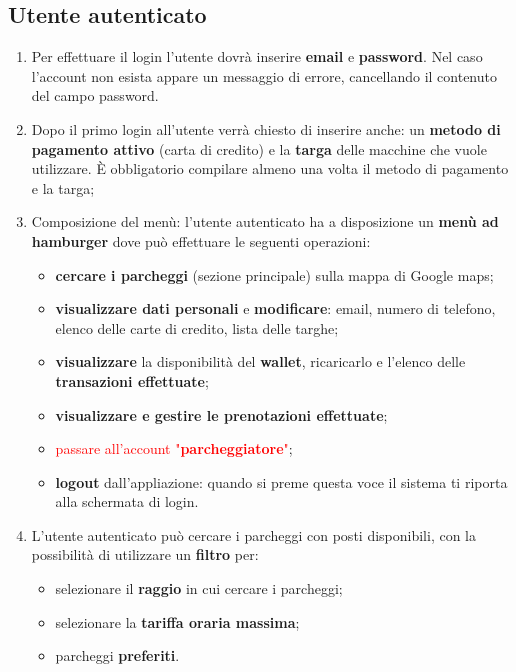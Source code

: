 \subsection*{Utente autenticato}
\begin{enumerate}[start=3,label={\bfseries RF\arabic*}]
    \item \label{itm:RF3} Per effettuare il login l’utente dovrà inserire \textbf{email} e \textbf{password}. Nel caso l’account non esista appare un messaggio di errore, cancellando il contenuto del campo password.
    \item \label{itm:RF4} Dopo il primo login all’utente verrà chiesto di inserire anche: un \textbf{metodo di pagamento attivo} (carta di credito) e la \textbf{targa} delle macchine che vuole utilizzare. È obbligatorio compilare almeno una volta il metodo di pagamento e la targa;
    \item \label{itm:RF5}Composizione del menù: l’utente autenticato ha a disposizione un \textbf{menù ad hamburger} dove può effettuare le seguenti operazioni:
    \begin{itemize}
        \item \textbf{cercare i parcheggi} (sezione principale) sulla mappa di Google maps;
        \item \textbf{visualizzare dati personali} e \textbf{modificare}: email, numero di telefono, elenco delle carte di credito, lista delle targhe;
        \item \textbf{visualizzare} la disponibilità del \textbf{wallet}, ricaricarlo e l’elenco delle \textbf{transazioni effettuate};
        \item \textbf{visualizzare e gestire le prenotazioni effettuate};
        \item \textcolor{red}{passare all'account "\textbf{parcheggiatore}"};
        \item \textbf{logout} dall’appliazione: quando si preme questa voce il sistema ti riporta alla schermata di login.
    \end{itemize}
    \item \label{itm:RF6}L’utente autenticato può cercare i parcheggi con posti disponibili, con la possibilità di utilizzare un \textbf{filtro} per:
    \begin{itemize}
        \item selezionare il \textbf{raggio} in cui cercare i parcheggi;
        \item selezionare la \textbf{tariffa oraria massima};
        \item parcheggi \textbf{preferiti}.

\end{itemize}
\end{enumerate}
